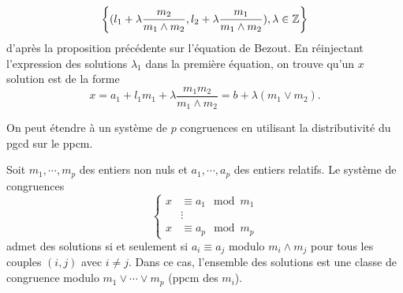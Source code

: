 \begin{demo}
  \begin{displaymath}
    \left \lbrace (l_1 + \lambda \frac{m_2}{m_1 \wedge m_2},l_2 + \lambda \frac{m_1}{m_1 \wedge m_2}), \lambda \in \mathbb{Z} \right\rbrace 
  \end{displaymath}
  d'après la proposition précédente sur l'équation de Bezout. En réinjectant l'expression des solutions $\lambda_1$ dans la première équation, on trouve qu'un $x$ solution est de la forme
  \begin{displaymath}
    x = a_1 + l_1 m_1 + \lambda \frac{m_1 m_2}{m_1 \wedge m_2} = b + \lambda (m_1 \vee m_2).
  \end{displaymath}
\end{demo}

On peut étendre à un système de $p$ congruences en utilisant la distributivité du pgcd sur le ppcm.
\begin{propn}\label{SystCong}
  Soit $m_1, \cdots, m_p$ des entiers non nuls et $a_1, \cdots, a_p$ des entiers relatifs. Le système de congruences
  \begin{displaymath}
    \left\lbrace 
      \begin{align*}
        x &\equiv a_1 \mod m_1 \\
          &\vdots \\
        x &\equiv a_p \mod m_p
      \end{align*}
    \right.
  \end{displaymath}
  admet des solutions si et seulement si $a_i \equiv a_j$ modulo $m_i \wedge m_j$ pour tous les couples $(i,j)$ avec $i \neq j$. Dans ce cas, l'ensemble des solutions est une classe de congruence modulo $m_1 \vee \cdots \vee m_p$ (ppcm des $m_i$).
\end{propn}
